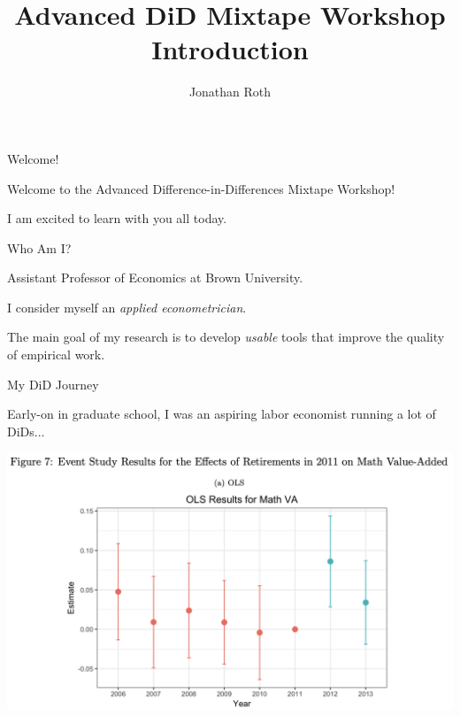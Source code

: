 \documentclass[usenames, dvipsnames, aspectratio = 169, 13pt]{beamer}
\author{Jonathan Roth}
\title[Advanced DiD Mixtape Workshop]{Advanced DiD Mixtape Workshop \\ Introduction}
\newenvironment{wideitemize}{\itemize\addtolength{\itemsep}{10pt}}{\enditemize}
\begin{document}
\maketitle

\begin{frame}{Welcome!}

\begin{wideitemize}
    
    \item
    Welcome to the Advanced Difference-in-Differences Mixtape Workshop!
    
    \item
    I am excited to learn with you all today.
    
\end{wideitemize}
    
\end{frame}


\begin{frame}{Who Am I?}
\begin{wideitemize}
    
    \item
    Assistant Professor of Economics at Brown University.
    
    \item
    I consider myself an \textit{applied econometrician}.
    
    \item
    The main goal of my research is to develop \textit{usable} tools that improve the quality of empirical work. 
    
\end{wideitemize}
\end{frame}


\begin{frame}{My DiD Journey}

\begin{wideitemize}
    \item
    Early-on in graduate school, I was an aspiring labor economist running a lot of DiDs... 
    
\end{wideitemize}
    \centering
    \includegraphics[width =0.75\linewidth]{Figures/act10-figure.png}
    
\end{frame}
\end{document}

